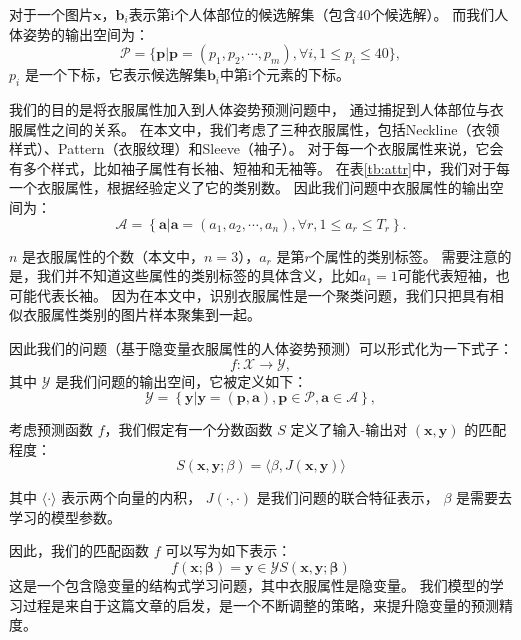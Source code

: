 对于一个图片$\mathbf{x}$，$\mathbf{b}_i$表示第i个人体部位的候选解集（包含40个候选解）。
而我们人体姿势的输出空间为：
\begin{equation}
    \mathcal{P} = \{\mathbf{p}| \mathbf{p}=(p_1,p_2,\cdots,p_m), \forall i, 1\leq p_i \leq 40\},
\end{equation}
$p_i$ 是一个下标，它表示候选解集$\mathbf{b}_i$中第i个元素的下标。

我们的目的是将衣服属性加入到人体姿势预测问题中，
通过捕捉到人体部位与衣服属性之间的关系。
在本文中，我们考虑了三种衣服属性，包括Neckline（衣领样式）、Pattern（衣服纹理）和Sleeve（袖子）。
对于每一个衣服属性来说，它会有多个样式，比如袖子属性有长袖、短袖和无袖等。
在表\ref{tb:attr}中，我们对于每一个衣服属性，根据经验定义了它的类别数。
因此我们问题中衣服属性的输出空间为：
\begin{equation}
    \mathcal{A} = \left\{ \mathbf{a}|\mathbf{a} = (a_1, a_2, \cdots, a_n), \forall r, 1 \leq a_r \leq T_r \right\}.
\end{equation}

$n$ 是衣服属性的个数（本文中，$n = 3$），$a_r$ 是第$r$个属性的类别标签。
需要注意的是，我们并不知道这些属性的类别标签的具体含义，比如$a_1 = 1$可能代表短袖，也可能代表长袖。
因为在本文中，识别衣服属性是一个聚类问题，我们只把具有相似衣服属性类别的图片样本聚集到一起。

因此我们的问题（基于隐变量衣服属性的人体姿势预测）可以形式化为一下式子：
\begin{equation}
    f: \mathcal{X} \rightarrow \mathcal{Y},
    \label{eq:task_func}
\end{equation}
其中 $\mathcal{Y}$ 是我们问题的输出空间，它被定义如下：
\begin{equation}
    \mathcal{Y} = \left\{ \mathbf{y}|\mathbf{y} = (\mathbf{p},\mathbf{a}), \mathbf{p} \in \mathcal{P}, \mathbf{a} \in \mathcal{A} \right\},
\end{equation}

考虑预测函数 $f$，我们假定有一个分数函数 $S$ 定义了输入-输出对 $(\mathbf{x}, \mathbf{y})$ 的匹配程度：
\begin{equation}
\label{eq:S(x,y;beta)}
    S(\mathbf{x}, \mathbf{y};\beta) = \langle \beta, J(\mathbf{x}, \mathbf{y}) \rangle
\end{equation}

其中 $\langle \cdot \rangle$ 表示两个向量的内积，
$J(\cdot, \cdot)$ 是我们问题的联合特征表示，
$\beta$ 是需要去学习的模型参数。

因此，我们的匹配函数 $f$ 可以写为如下表示：
\begin{equation}
    f(\mathbf{x}; \mathbf{\beta}) = { \mathbf{y} \in \mathcal{Y} } S(\mathbf{x}, \mathbf{y}; \mathbf{\beta})
    \label{eq:score}
\end{equation}
这是一个包含隐变量的结构式学习问题，其中衣服属性是隐变量。
我们模型的学习过程是来自于\cite{dpm}这篇文章的启发，是一个不断调整的策略，来提升隐变量的预测精度。


